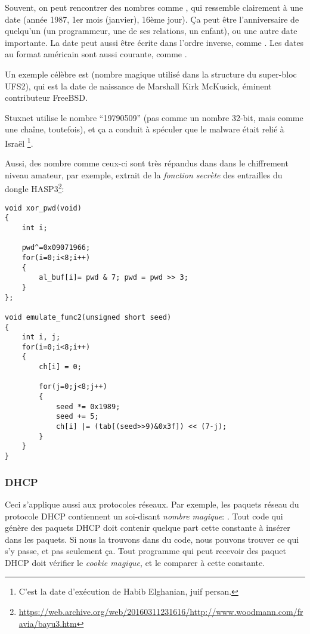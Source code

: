 
Souvent, on peut rencontrer des nombres comme , qui ressemble clairement
à une date (année 1987, 1er mois (janvier), 16ème jour).
Ça peut être l'anniversaire de quelqu'un (un programmeur, une de ses relations, un
enfant), ou une autre date importante.
La date peut aussi être écrite dans l'ordre inverse, comme .
Les dates au format américain sont aussi courante, comme .

Un exemple célèbre est  (nombre magique utilisé dans la structure
du super-bloc UFS2), qui est la date de naissance de Marshall Kirk McKusick, éminent
contributeur FreeBSD.

Stuxnet utilise le nombre ``19790509'' (pas comme un nombre 32-bit, mais comme une
chaîne, toutefois), et ça a conduit à spéculer que le malware était relié à Israël
\footnote{C'est la date d'exécution de Habib Elghanian, juif persan.}.

Aussi, des nombre comme ceux-ci sont très répandus dans dans le chiffrement niveau
amateur, par exemple, extrait de la \emph{fonction secrète} des entrailles du dongle
HASP3\footnote{\url{https://web.archive.org/web/20160311231616/http://www.woodmann.com/fravia/bayu3.htm}}:

\begin{lstlisting}[style=customc]
void xor_pwd(void) 
{ 
	int i; 
	
	pwd^=0x09071966;
	for(i=0;i<8;i++) 
	{ 
		al_buf[i]= pwd & 7; pwd = pwd >> 3; 
	} 
};

void emulate_func2(unsigned short seed)
{ 
	int i, j; 
	for(i=0;i<8;i++) 
	{ 
		ch[i] = 0; 
		
		for(j=0;j<8;j++)
		{ 
			seed *= 0x1989; 
			seed += 5; 
			ch[i] |= (tab[(seed>>9)&0x3f]) << (7-j); 
		}
	} 
}
\end{lstlisting}

\subsubsection{DHCP}

Ceci s'applique aussi aux protocoles réseaux.
Par exemple, les paquets réseau du protocole DHCP contiennent un soi-disant \emph{nombre
magique}: .
Tout code qui génère des paquets DHCP doit contenir quelque part cette constante
à insérer dans les paquets.
Si nous la trouvons dans du code, nous pouvons trouver ce qui s'y passe, et pas seulement ça.
Tout programme qui peut recevoir des paquet DHCP doit vérifier le \emph{cookie magique},
et le comparer à cette constante.

